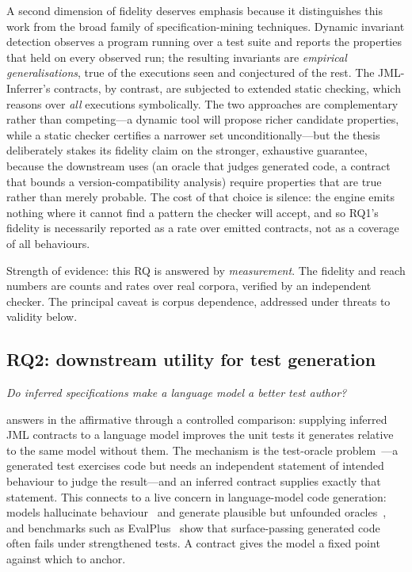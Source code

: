 A second dimension of fidelity deserves emphasis because it distinguishes this
work from the broad family of specification-mining techniques. Dynamic invariant
detection observes a program running over a test suite and reports the properties
that held on every observed run; the resulting invariants are \emph{empirical
generalisations}, true of the executions seen and conjectured of the rest. The
JML-Inferrer's contracts, by contrast, are subjected to extended static checking,
which reasons over \emph{all} executions symbolically. The two approaches are
complementary rather than competing---a dynamic tool will propose richer
candidate properties, while a static checker certifies a narrower set
unconditionally---but the thesis deliberately stakes its fidelity claim on the
stronger, exhaustive guarantee, because the downstream uses (an oracle that judges
generated code, a contract that bounds a version-compatibility analysis) require
properties that are true rather than merely probable. The cost of that choice is
silence: the engine emits nothing where it cannot find a pattern the checker will
accept, and so RQ1's fidelity is necessarily reported as a rate over emitted
contracts, not as a coverage of all behaviours.

Strength of evidence: this RQ is answered by \emph{measurement}. The fidelity and
reach numbers are counts and rates over real corpora, verified by an independent
checker. The principal caveat is corpus dependence, addressed under threats to
validity below.

\subsection{RQ2: downstream utility for test generation}

\emph{Do inferred specifications make a language model a better test author?}

 answers in the affirmative through a controlled comparison:
supplying inferred JML contracts to a language model improves the unit tests it
generates relative to the same model without them. The mechanism is the
test-oracle problem~\citep{barr2015oracle}---a generated test exercises code but
needs an independent statement of intended behaviour to judge the result---and an
inferred contract supplies exactly that statement. This connects to a live concern
in language-model code generation: models hallucinate
behaviour~\citep{zhang2025hallucination} and generate plausible but unfounded
oracles~\citep{liu2026oracle}, and benchmarks such as
EvalPlus~\citep{liu2023evalplus} show that surface-passing generated code often
fails under strengthened tests. A contract gives the model a fixed point against
which to anchor.

